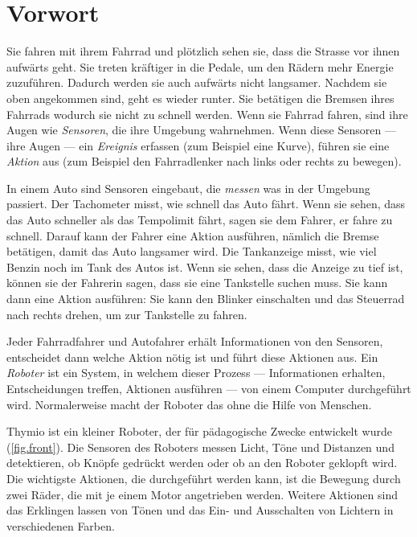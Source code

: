 \chapter*{Vorwort}
Sie fahren mit ihrem Fahrrad und plötzlich sehen sie, dass die Strasse vor ihnen aufwärts geht. Sie treten kräftiger in die Pedale, um den Rädern mehr Energie zuzuführen. Dadurch werden sie auch aufwärts nicht langsamer. Nachdem sie oben angekommen sind, geht es wieder runter. Sie betätigen die Bremsen ihres Fahrrads wodurch sie nicht zu schnell werden. Wenn sie Fahrrad fahren, sind ihre Augen wie \textit{Sensoren}, die ihre Umgebung wahrnehmen. Wenn diese Sensoren — ihre Augen — ein \textit{Ereignis} erfassen (zum Beispiel eine Kurve), führen sie eine \textit{Aktion} aus (zum Beispiel den Fahrradlenker nach links oder rechts zu bewegen).

In einem Auto sind Sensoren eingebaut, die \textit{messen} was in der Umgebung passiert. Der Tachometer misst, wie schnell das Auto fährt. Wenn sie sehen, dass das Auto schneller als das Tempolimit fährt, sagen sie dem Fahrer, er fahre zu schnell. Darauf kann der Fahrer eine Aktion ausführen, nämlich die Bremse betätigen, damit das Auto langsamer wird. Die Tankanzeige misst, wie viel Benzin noch im Tank des Autos ist. Wenn sie sehen, dass die Anzeige zu tief ist, können sie der Fahrerin sagen, dass sie eine Tankstelle suchen muss. Sie kann dann eine Aktion ausführen: Sie kann den Blinker einschalten und das Steuerrad nach rechts drehen, um zur Tankstelle zu fahren.

Jeder Fahrradfahrer und Autofahrer erhält Informationen von den Sensoren, entscheidet dann welche Aktion nötig ist und führt diese Aktionen aus. Ein \textit{Roboter} ist ein System, in welchem dieser Prozess — Informationen erhalten, Entscheidungen treffen, Aktionen ausführen — von einem Computer durchgeführt wird. Normalerweise macht der Roboter das ohne die Hilfe von Menschen.

Thymio ist ein kleiner Roboter, der für pädagogische Zwecke entwickelt wurde (\cref{fig.front}). Die Sensoren des Roboters messen Licht, Töne und Distanzen und detektieren, ob Knöpfe gedrückt werden oder ob an den Roboter geklopft wird. Die wichtigste Aktionen, die durchgeführt werden kann, ist die Bewegung durch zwei Räder, die mit je einem Motor angetrieben werden. Weitere Aktionen sind das Erklingen lassen von Tönen und das Ein- und Ausschalten von Lichtern in verschiedenen Farben.

